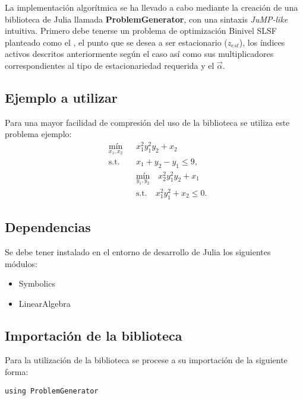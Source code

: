 La implementación algorítmica se ha llevado a cabo mediante la creación de una biblioteca de Julia
llamada \textbf{ProblemGenerator}, con una sintaxis \textit{JuMP-like} intuitiva.
Primero debe tenerse un problema de optimización Binivel SLSF planteado como el , el punto que se desea a ser estacionario ($z_{est}$), los índices activos descritos anteriormente 
según el caso así como sus multiplicadores correspondientes al tipo de estacionariedad requerida y el $\vec{\alpha}$.

\subsection{Ejemplo a utilizar}
Para una mayor facilidad de compresión del uso de la biblioteca se utiliza este problema ejemplo:
\begin{equation}
    \begin{aligned}
        & \underset{x_1, x_2}{\text{mín}} 
        && x_1^2 y_1^2 y_2 + x_2 \\
        & \text{s.t.} 
        && x_1 + y_2 - y_1 \leq 9, \\
        & 
        && \underset{y_1, y_2}{\text{mín}} 
        \quad x_2^2 y_1^2 y_2 + x_1 \\
        & 
        && \text{s.t.} 
        \quad x_1^2 y_1^2 + x_2 \leq 0.
    \end{aligned}
    \label{ProblemaEjemplo}
\end{equation}
\subsection{Dependencias}
Se debe tener instalado en el entorno de desarrollo de Julia los siguientes módulos:
\begin{itemize}
    \item Symbolics 
    \item LinearAlgebra
\end{itemize}

\subsection{Importación de la biblioteca}
Para la utilización de la biblioteca se procese a su importación de la siguiente forma:
\begin{lstlisting}[caption=Importar el Módulo]
    using ProblemGenerator
\end{lstlisting}

